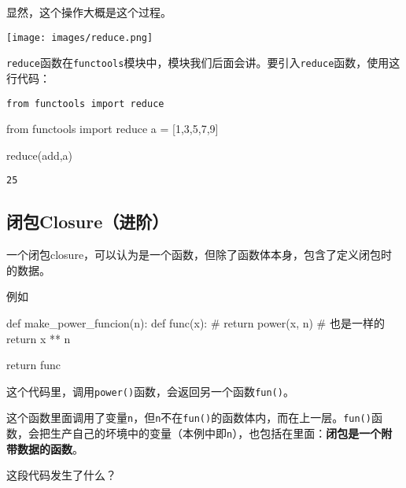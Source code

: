 \documentclass[
  letterpaper,
  DIV=11,
  numbers=noendperiod]{scrreprt}
\newenvironment{Shaded}{\begin{snugshade}}{\end{snugshade}}
\newcommand{\BuiltInTok}[1]{\textcolor[rgb]{0.00,0.23,0.31}{#1}}
\newcommand{\CommentTok}[1]{\textcolor[rgb]{0.37,0.37,0.37}{#1}}
\newcommand{\ControlFlowTok}[1]{\textcolor[rgb]{0.00,0.23,0.31}{#1}}
\newcommand{\DecValTok}[1]{\textcolor[rgb]{0.68,0.00,0.00}{#1}}
\newcommand{\ImportTok}[1]{\textcolor[rgb]{0.00,0.46,0.62}{#1}}
\newcommand{\KeywordTok}[1]{\textcolor[rgb]{0.00,0.23,0.31}{#1}}
\newcommand{\NormalTok}[1]{\textcolor[rgb]{0.00,0.23,0.31}{#1}}
\newcommand{\OperatorTok}[1]{\textcolor[rgb]{0.37,0.37,0.37}{#1}}
\begin{document}
显然，这个操作大概是这个过程。

\texttt{[image: images/reduce.png]}

\texttt{reduce}函数在\texttt{functools}模块中，模块我们后面会讲。要引入\texttt{reduce}函数，使用这行代码：

\texttt{from\ functools\ import\ reduce}

\begin{Shaded}
\begin{Highlighting}[]
\ImportTok{from}\NormalTok{ functools }\ImportTok{import} \BuiltInTok{reduce}
\NormalTok{a }\OperatorTok{=}\NormalTok{ [}\DecValTok{1}\NormalTok{,}\DecValTok{3}\NormalTok{,}\DecValTok{5}\NormalTok{,}\DecValTok{7}\NormalTok{,}\DecValTok{9}\NormalTok{]}

\BuiltInTok{reduce}\NormalTok{(add,a)}
\end{Highlighting}
\end{Shaded}

\begin{verbatim}
25
\end{verbatim}

\hypertarget{ux95edux5305closureux8fdbux9636}{%
\subsection{闭包Closure（进阶）}\label{ux95edux5305closureux8fdbux9636}}

一个闭包closure，可以认为是一个函数，但除了函数体本身，包含了定义闭包时的数据。

例如

\begin{Shaded}
\begin{Highlighting}[]
\KeywordTok{def}\NormalTok{ make\_power\_funcion(n):}
    \KeywordTok{def}\NormalTok{ func(x):}
        \CommentTok{\# return power(x, n) \# 也是一样的}
        \ControlFlowTok{return}\NormalTok{ x }\OperatorTok{**}\NormalTok{ n }
    
    \ControlFlowTok{return}\NormalTok{ func}
\end{Highlighting}
\end{Shaded}

这个代码里，调用\texttt{power()}函数，会返回另一个函数\texttt{fun()}。

这个函数里面调用了变量\texttt{n}，但\texttt{n}不在\texttt{fun()}的函数体内，而在上一层。\texttt{fun()}函数，会把生产自己的坏境中的变量（本例中即\texttt{n}），也包括在里面：\textbf{闭包是一个附带数据的函数}。

这段代码发生了什么？
\end{document}
